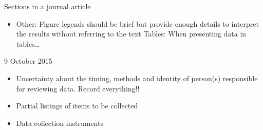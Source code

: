 \documentclass{article}
\begin{document}
\begin{section}{Sections in a journal article}
\begin{itemize}
			Present the data after analysis in a condensed way
			Extract key trends and describe them
			- Use subtitles in results for individual findings/trends.

			Discussion
			Based on the evidence shown in results, discuss
			\begin{itemize}
				\item New principles established or old reinforced
				\item New generalizations that can be deduced
				\item Comparison with others' findings
				\item Implications of the findings
				\item Limitations of the work
			\end{itemize}
			Address the objectives of the study and the significance of the results
		\item Other:
			Figure legends should be brief but provide enough details to interpret the results without referring to the text
			Tables: When presenting data in tables\ldots
	\end{itemize}

\end{section}
\begin{section}{9 October 2015}
	\begin{itemize}
		\item Uncertainty about the timing, methods and identity of person(s) responsible for reviewing data. Record everything!!
		\item Partial listings of items to be collected
		\item Data collection instruments
	\end{itemize}

\end{section}
\end{document}

